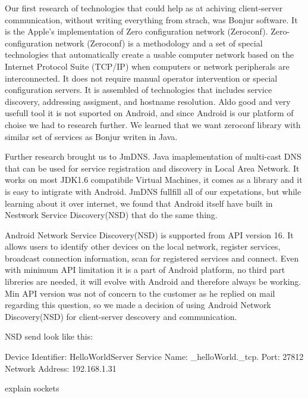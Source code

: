 Our first research of technologies that could help as at achiving client-server communication, without writing everything from strach, was Bonjur software. 
It is the Apple's implementation of Zero configuration network (Zeroconf). 
Zero-configuration network (Zeroconf)  is a methodology and a set of special technologies that automatically create a usable computer network based on the Internet Protocol Suite (TCP/IP) when computers or network peripherals are interconnected. 
It does not require manual operator intervention or special configuration servers.
It is assembled of technologies that includes service discovery, addressing assigment, and hostname resolution.
Aldo good and very usefull tool it is not suported on Android, and since Android is our platform of choise we had to research further. 
We learned that we want zeroconf library with similar set of services as Bonjur writen in Java.


Further research brought us to JmDNS. Java imaplementation of multi-cast DNS that can be used for service registration and discovery in Local Area Network. 
It works on most JDK1.6 compatibile Virtual Machines, it comes as a library and it is easy to intigrate with Android. 
JmDNS fullfill all of our expetations, but while learning about it over internet, we found that Android itself have built in Nestwork Service Discovery(NSD) that do the same thing.


Android Network Service Discovery(NSD) is supported from API version 16. 
It allows users to identify other devices on the local network, register services, broadcast connection information, scan for registered services and connect.
Even with minimum API limitation it is a part of Android platform, no third part libreries are needed, it will evolve with Android and therefore always be working.
Min API version was not of concern to the customer as he replied on mail regarding this question, so we made a decision of using Android Network Discovery(NSD) for client-server descovery and communication.

NSD send look like this:

Device Identifier: HelloWorldServer
Service Name: _helloWorld._tcp.
Port: 27812
Network Address: 192.168.1.31

explain sockets

